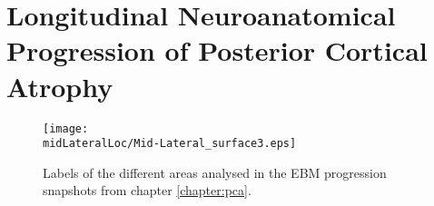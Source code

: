 
\chapter[Longitudinal Neuroanatomical Progression of PCA]{Longitudinal Neuroanatomical Progression of Posterior Cortical Atrophy}
\label{sec:adni_extra_appendix}


\newcommand*{\midLateralLoc}{images}
\newcommand*{\scaleLabelImg}{0.7}
\begin{figure}
  \centering
  \texttt{[image: \\midLateralLoc/Mid-Lateral\_surface3.eps]}
  \caption[Labels of the different areas analysed in the EBM progression snapshots]{Labels of the different areas analysed in the EBM progression snapshots from chapter \ref{chapter:pca}. }
  \label{fig:ebmSnapLabels}
\end{figure}


